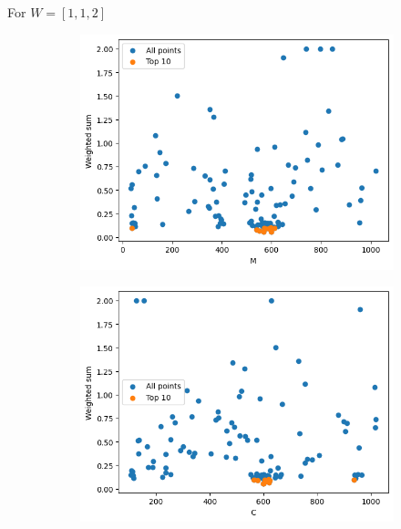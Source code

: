 \begin{frame}
    For \(W = [1, 1, 2]\)
    \begin{figure}
        \centering
        \hfill
        \begin{subfigure}{0.45\textwidth}
            \includegraphics[width=\textwidth]{../images/report/w112-M.png}
        \end{subfigure}
        \hfill
        \begin{subfigure}{0.45\textwidth}
            \includegraphics[width=\textwidth]{../images/report/w112-C.png}
        \end{subfigure}
        \hfill
        

\end{figure}
\end{frame}
